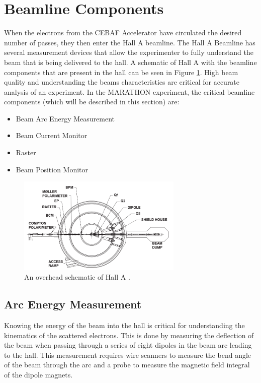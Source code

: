 \section{Beamline Components}

When the electrons from the CEBAF Accelerator have circulated the desired number of passes, they then enter the Hall A beamline. The Hall A Beamline has several measurement devices that allow the experimenter to fully understand the beam that is being delivered to the hall. A schematic of Hall A with the beamline components that are present in the hall can be seen in Figure \ref{fig:ha_overhead}. High beam quality and understanding the beams characteristics are critical for accurate analysis of an experiment. In the MARATHON experiment, the critical beamline components (which will be described in this section) are:

\begin{itemize}
	\item Beam Arc Energy Measurement
	\item Beam Current Monitor
	\item Raster
	\item Beam Position Monitor
\end{itemize}

\begin{figure}[h]
\begin{center}
	\includegraphics[width=0.7\textwidth]{./setup/fig/HallA_overhead.png}
	\caption{An overhead schematic of Hall A \cite{HANIM}.}
	\label{fig:ha_overhead}
\end{center}
\end{figure}

\subsection{Arc Energy Measurement}

Knowing the energy of the beam into the hall is critical for understanding the kinematics of the scattered electrons. This is done by measuring the deflection of the beam when passing through a series of eight dipoles in the beam arc leading to the hall. This measurement requires wire scanners to measure the bend angle of the beam through the arc and a probe to measure the magnetic field integral of the dipole magnets. 

